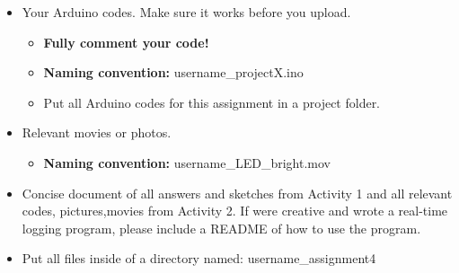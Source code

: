 \documentclass[10pt]{article}
\begin{document}
\begin{itemize}
	\item Your Arduino codes. Make sure it works before you upload.
	\begin{itemize}
		\item \textbf{Fully comment your code!} 
		\item \textbf{Naming convention:} username\_projectX.ino
		\item Put all Arduino codes for this assignment in a project folder. 
	\end{itemize}

	\item Relevant movies or photos.
	\begin{itemize}
		\item \textbf{Naming convention:} username\_LED\_bright.mov
	\end{itemize}
	\item Concise document of all answers and sketches from Activity 1 and all relevant codes, pictures,movies from Activity 2. If were creative and wrote a real-time logging program, please include a README of how to use the program.
	\item Put all files inside of a directory named: username\_assignment4
\end{itemize}
\end{document}
